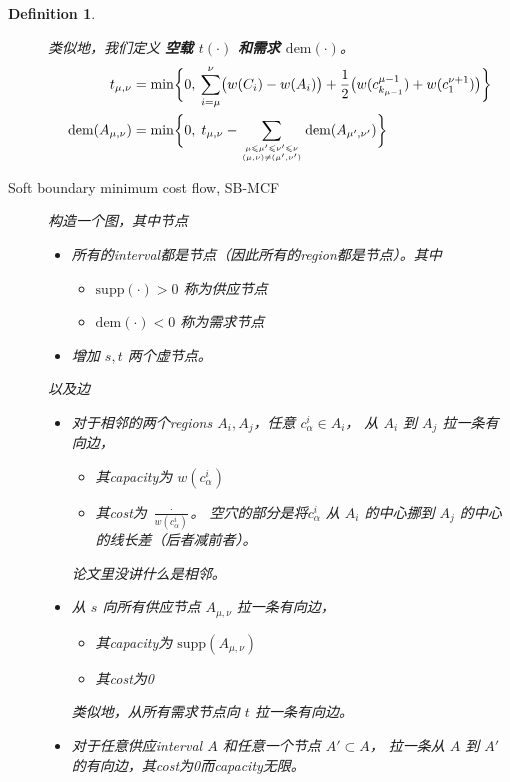 \documentclass[UTF8,a4paper]{ctexart}
\renewcommand{\emph}[1]{\textbf{#1}}
\renewcommand{\leq}{\leqslant}
\newcommand{\supp}[1]{\text{supp} ({#1})}
\newcommand{\dem}[1]{\text{dem} ({#1})}
\renewcommand{\atop}[2]{\genfrac{}{}{0pt}{}{#1}{#2}}
\newtheorem{definition}{Definition}
\begin{document}
\begin{definition}
\begin{description}
        类似地，我们定义 \emph{空载 $t(\cdot)$ 和需求 $\dem{\cdot}$}。
        \begin{align*}
            t_{\mu,\nu} &=\min\biggl\{%
                0,\:%
                \sum_{i=\mu}^{\nu}\bigl(w(C_i)-w(A_i)\bigr)%
                +\frac{1}{2}\bigl(w(c^{\mu-1}_{k_{\mu-1}})+w(c^{\nu+1}_1)\bigr)
            \biggr\}
            \\
            \dem{A_{\mu,\nu}} &=\min\biggl\{%
                0,\;%
                t_{\mu,\nu}%
                -\sum_{\atop{\mu\leq\mu'\leq\nu'\leq\nu}{(\mu,\nu)\neq(\mu',\nu')}}\dem{A_{\mu',\nu'}}%
            \biggr\}
        \end{align*}
    \item[Soft boundary minimum cost flow, SB-MCF]
        构造一个图，其中节点
        \begin{itemize}
        \item 所有的interval都是节点（因此所有的region都是节点）。其中
            \begin{itemize}
            \item $\supp{\cdot}>0$ 称为供应节点
            \item $\dem{\cdot}<0$ 称为需求节点
            \end{itemize}
        \item 增加 $s,t$ 两个虚节点。
        \end{itemize}
        以及边
        \begin{itemize}
        \item 对于相邻的两个regions $A_i,A_j$，任意 $c^i_\alpha\in A_i$，
            从 $A_i$ 到 $A_j$ 拉一条有向边，
            \begin{itemize}
            \item 其capacity为 $w(c^i_\alpha)$
            \item 其cost为 $\frac{\cdot}{w(c^i_\alpha)}$。
                空穴的部分是将$c^i_\alpha$ 从 $A_i$ 的中心挪到 $A_j$ 的中心的线长差（后者减前者）。
            \end{itemize}
            \begin{noteblock}
                论文里没讲什么是相邻。
            \end{noteblock}
        \item 从 $s$ 向所有供应节点 $A_{\mu,\nu}$ 拉一条有向边，
            \begin{itemize}
            \item 其capacity为 $\supp{A_{\mu,\nu}}$
            \item 其cost为0
            \end{itemize}
            类似地，从所有需求节点向 $t$ 拉一条有向边。
        \item 对于任意供应interval $A$ 和任意一个节点 $A'\subset A$，
            拉一条从 $A$ 到 $A'$ 的有向边，其cost为0而capacity无限。
    

\end{itemize}
\end{description}
\end{definition}
\end{document}
